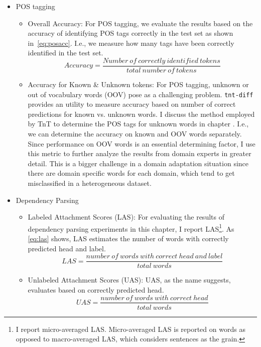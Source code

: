 \begin{itemize}
    \item POS tagging
    \begin{itemize}
        \item Overall Accuracy: For POS tagging, we evaluate the results based on the accuracy of identifying POS tags correctly in the test set as shown in~\ref{eq:posacc}. I.e., we measure how many tags have been correctly identified in the test set.
        \begin{equation} \label{eq:posacc}
            Accuracy = \frac{Number\ of\ correctly\ identified\ tokens}{total\ number\ of\ tokens}
        \end{equation}
        \item Accuracy for Known \& Unknown tokens: For POS tagging, unknown or out of vocabulary words (OOV) pose as a challenging problem. \texttt{tnt-diff} provides an utility to measure accuracy based on number of correct predictions for known vs. unknown words. I discuss the method employed by TnT to determine the POS tags for unknown words in chapter . I.e., we can determine the accuracy on known and OOV words separately. Since performance on OOV words is an essential determining factor, I use this metric to further analyze the results from domain experts in greater detail. This is a bigger challenge in a domain adaptation situation since there are domain specific words for each domain, which tend to get misclassified in a heterogeneous dataset.
    \end{itemize}
    \item Dependency Parsing
    \begin{itemize}
        \item Labeled Attachment Scores (LAS): For evaluating the results of dependency parsing experiments in this chapter, I report LAS\footnote{I report micro-averaged LAS. Micro-averaged LAS is reported on words as opposed to macro-averaged LAS, which considers sentences as the grain.}.  As \ref{eq:las} shows, LAS estimates the number of words with correctly predicted head and label.
        \begin{equation} \label{eq:las}
            LAS = \frac{number\ of\ words\ with\ correct\ head\ and\ label}{total\ words}
        \end{equation}
        
        \item Unlabeled Attachment Scores (UAS): UAS, as the name suggests, evaluates based on correctly predicted head. 
        \begin{equation} \label{eq:uas}
            UAS = \frac{number\ of\ words\ with\ correct\ head}{total\ words}
        \end{equation}
        
    \end{itemize}
\end{itemize}



